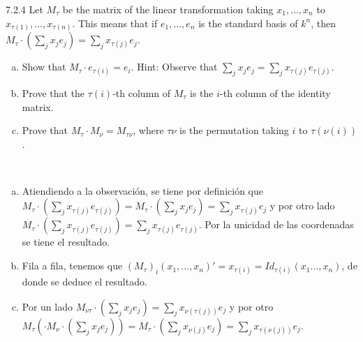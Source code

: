 \documentclass[twoside]{article}
\begin{document}
\begin{ejercicio}{7.2.4}
Let $M_{τ}$ be the matrix of the linear transformation taking $x_1,\dots , x_n$ to $x_{τ(1)},\dots , x_{τ(n)}$.
This means that if $e_1, \dots, e_n$ is the standard basis of $k^n$, then $M_τ \cdot(\sum_j x_je_j) =\sum_j x_{τ(j)}e_j$.
\begin{enumerate}[a.]
\item Show that $M_τ \cdot e_{τ(i)} = e_i$. Hint: Observe that
$\sum_j x_je_j =\sum_j x_{τ(j)}e_{τ(j)}$.
\item Prove that the $τ(i)$-th column of $M_τ$ is the $i$-th column of the identity matrix.
\item Prove that $M_τ \cdot M_ν = M_{τν}$, where $τν$ is the permutation taking $i$ to $τ(ν(i))$.
\end{enumerate}

\end{ejercicio}
\begin{solucion}\
\begin{enumerate}[a.]
\item Atiendiendo a la observación, se tiene por definición que $M_τ \cdot(\sum_j x_{τ(j)}e_{τ(j)})=M_τ \cdot(
\sum_j x_je_j) =\sum_j x_{τ(j)}e_j$ y por otro lado $M_τ \cdot(\sum_j x_{τ(j)}e_{τ(j)})=\sum_j x_{τ(j)}e_{τ(j)}$. Por la unicidad de las coordenadas se tiene el resultado. 
\item Fila a fila, tenemos que $(M_τ)_i(x_1,\dots, x_n)'=x_{\tau(i)}=Id_{\tau(i)}(x_1\dots, x_n)$, de donde se deduce el resultado.  
\item Por un lado $M_{ντ}\cdot(\sum_j x_je_j) =\sum_j x_{\nu(τ(j))}e_j$ y por otro $M_τ (\cdot M_ν \cdot(\sum_j x_je_j))=M_τ \cdot(\sum_j x_{\nu(j)}e_j)=\sum_j x_{\tau(\nu(j))}e_j$.
\end{enumerate}
\end{solucion}
\newpage
\end{document}
